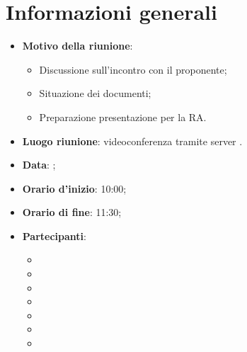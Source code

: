 \section{Informazioni generali}
\begin{itemize}
\item \textbf{Motivo della riunione}: 
\begin{itemize}
	\item Discussione sull'incontro con il proponente;
	\item Situazione dei documenti;
	\item Preparazione presentazione per la RA.
\end{itemize}
\item \textbf{Luogo riunione}: videoconferenza tramite server .
\item \textbf{Data}: \Data{};
\item \textbf{Orario d'inizio}: 10:00;
\item \textbf{Orario di fine}: 11:30;
\item \textbf{Partecipanti}:
	\begin{itemize}
	\item \BM{}
	\item \SG{}
	\item \SP{}
	\item \ZM{}
	\item \PA{}
	\item \RA{}
	\item \SH{}
	\end{itemize}
\end{itemize}

\newpage
